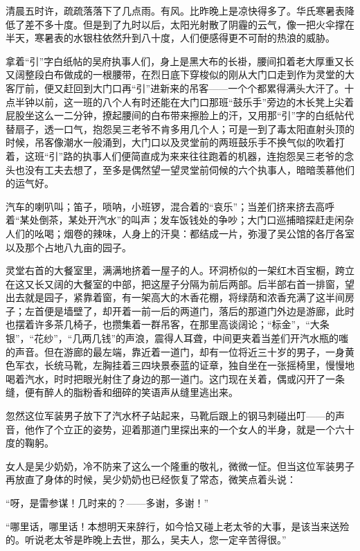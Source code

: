 \par 清晨五时许，疏疏落落下了几点雨。有风。比昨晚上是凉快得多了。华氏寒暑表降低了差不多十度。但是到了九时以后，太阳光射散了阴霾的云气，像一把火伞撑在半天，寒暑表的水银柱依然升到八十度，人们便感得更不可耐的热浪的威胁。
\par 拿着“引”字白纸帖的吴府执事人们，身上是黑大布的长褂，腰间扣着老大厚重又长又阔整段白布做成的一根腰带，在烈日底下穿梭似的刚从大门口走到作为灵堂的大客厅前，便又赶回到大门口再“引”进新来的吊客——一个个都累得满头大汗了。十点半钟以前，这一班的八个人有时还能在大门口那班“鼓乐手”旁边的木长凳上尖着屁股坐这么一二分钟，撩起腰间的白布带来擦脸上的汗，又用那“引”字的白纸帖代替扇子，透一口气，抱怨吴三老爷不肯多用几个人；可是一到了毒太阳直射头顶的时候，吊客像潮水一般涌到，大门口以及灵堂前的两班鼓乐手不换气似的吹着打着，这班“引”路的执事人们便简直成为来来往往跑着的机器，连抱怨吴三老爷的念头也没有工夫去想了，至多是偶然望一望灵堂前伺候的六个执事人，暗暗羡慕他们的运气好。
\par 汽车的喇叭叫；笛子，唢呐，小班锣，混合着的“哀乐”；当差们挤来挤去高呼着“某处倒茶，某处开汽水”的叫声；发车饭钱处的争吵；大门口巡捕暗探赶走闲杂人们的吆喝；烟卷的辣味，人身上的汗臭：都结成一片，弥漫了吴公馆的各厅各室以及那个占地八九亩的园子。
\par 灵堂右首的大餐室里，满满地挤着一屋子的人。环洞桥似的一架红木百宝橱，跨立在这又长又阔的大餐室的中部，把这屋子分隔为前后两部。后半部右首一排窗，望出去就是园子，紧靠着窗，有一架高大的木香花棚，将绿荫和浓香充满了这半间房子；左首便是墙壁了，却开着一前一后的两道门，落后的那道门外边是游廊，此时也摆着许多茶几椅子，也攒集着一群吊客，在那里高谈阔论；“标金”，“大条银”，“花纱”，“几两几钱”的声浪，震得人耳聋，中间更夹着当差们开汽水瓶的嗤的声音。但在游廊的最左端，靠近着一道门，却有一位将近三十岁的男子，一身黄色军衣，长统马靴，左胸挂着三四块景泰蓝的证章，独自坐在一张摇椅里，慢慢地喝着汽水，时时把眼光射住了身边的那一道门。这门现在关着，偶或闪开了一条缝，便有醉人的脂粉香和细碎的笑语声从缝里逃出来。
\par 忽然这位军装男子放下了汽水杯子站起来，马靴后跟上的钢马刺碰出叮——的声音，他作了个立正的姿势，迎着那道门里探出来的一个女人的半身，就是一个六十度的鞠躬。
\par 女人是吴少奶奶，冷不防来了这么一个隆重的敬礼，微微一怔。但当这位军装男子再放直了身体的时候，吴少奶奶也已经恢复了常态，微笑点着头说：
\par “呀，是雷参谋！几时来的？——多谢，多谢！”
\par “哪里话，哪里话！本想明天来辞行，如今恰又碰上老太爷的大事，是该当来送殓的。听说老太爷是昨晚上去世，那么，吴夫人，您一定辛苦得很。”
